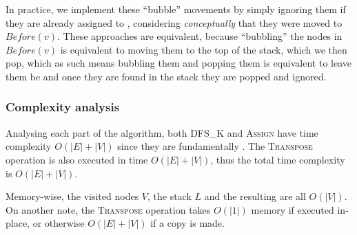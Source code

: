In practice, we implement these ``bubble'' movements by simply ignoring them if they are already assigned to , considering \emph{conceptually} that they were moved to $Before(v)$. These approaches are equivalent, because ``bubbling'' the nodes in $Before(v)$ is equivalent to moving them to the top of the stack, which we then pop, which as such means bubbling them and popping them is equivalent to leave them be and once they are found in the stack they are popped and ignored. 

\subsubsection{Complexity analysis}
Analysing each part of the algorithm, both \textsc{DFS\_K} and \textsc{Assign} have time complexity $O(|E|+|V|)$ since they are fundamentally . The \textsc{Transpose} operation is also executed in time $O(|E|+|V|)$, thus the total time complexity is $O(|E|+|V|)$.\par
Memory-wise, the visited nodes $V$, the stack $L$ and the resulting  are all $O(|V|)$. On another note, the \textsc{Transpose} operation takes $O(|1|)$ memory if executed in-place, or otherwise $O(|E|+|V|)$ if a copy is made.


